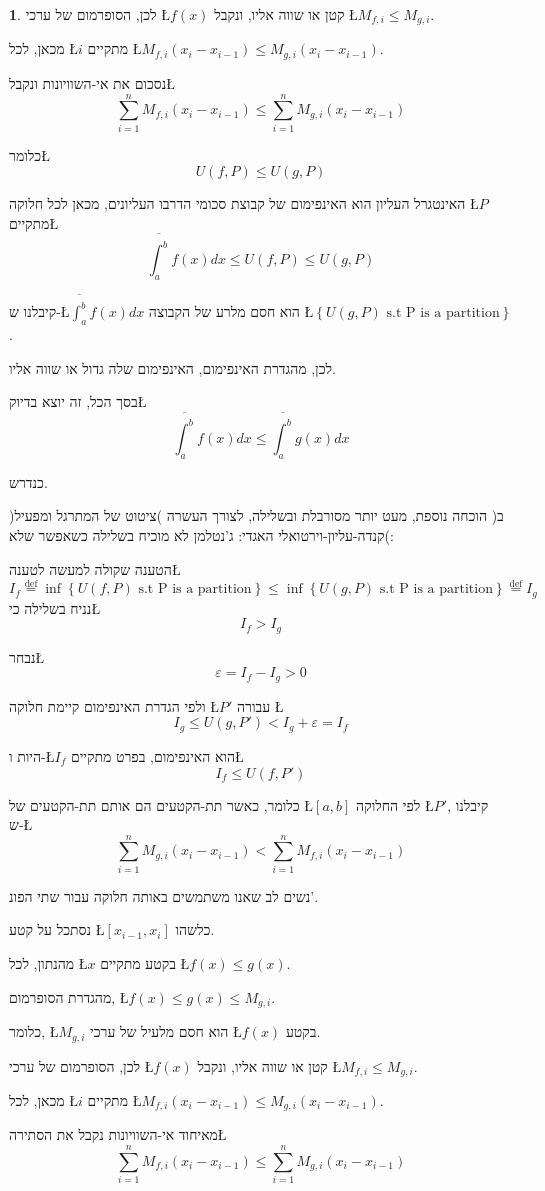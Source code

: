 \documentclass[english,hebrew]{article}
\theoremstyle{plain}
\theoremstyle{definition}
\theoremstyle{definition}
\newtheorem*{sol*}{\protect\solutionname}
\providecommand{\solutionname}{פתרון}
\begin{document}
\begin{sol*}
לכן, הסופרמום של ערכי \L{$f(x)$} קטן או שווה אליו, ונקבל \L{$M_{f,i}\le M_{g,i}$}.

מכאן, לכל \L{$i$} מתקיים \L{$M_{f,i}\left(x_{i}-x_{i-1}\right)\le M_{g,i}\left(x_{i}-x_{i-1}\right)$}.

נסכום את אי-השוויונות ונקבל\L{%
\[
\underset{i=1}{\overset{n}{\sum}}M_{f,i}\left(x_{i}-x_{i-1}\right)\le\underset{i=1}{\overset{n}{\sum}}M_{g,i}\left(x_{i}-x_{i-1}\right)
\]
}%

כלומר\L{%
\[
U\left(f,P\right)\le U\left(g,P\right)
\]
}%

האינטגרל העליון הוא האינפימום של קבוצת סכומי הדרבו העליונים, מכאן
לכל חלוקה \L{$P$} מתקיים\L{%
\[
\overline{\int_{a}^{b}}f(x)dx\le U\left(f,P\right)\le U\left(g,P\right)
\]
}%

קיבלנו ש-\L{$\overline{\int_{a}^{b}}f(x)dx$} הוא חסם מלרע של הקבוצה
\L{$\left\{ U\left(g,P\right)\text{ s.t P is a partition}\right\} $}.

לכן, מהגדרת האינפימום, האינפימום שלה גדול או שווה אליו.

בסך הכל, זה יוצא בדיוק\L{%
\[
\overline{\int_{a}^{b}}f(x)dx\le\overline{\int_{a}^{b}}g(x)dx
\]
}%

כנדרש.

)ב( הוכחה נוספת, מעט יותר מסורבלת ובשלילה, לצורך העשרה )ציטוט של המתרגל
ומפעיל קנדה-עליון-וירטואלי האגדי: ג'נטלמן לא מוכיח בשלילה כשאפשר שלא(:

הטענה שקולה למעשה לטענה\L{%
\[
I_{f}\overset{\text{def}}{=}\inf\left\{ U\left(f,P\right)\text{ s.t P is a partition}\right\} \le\inf\left\{ U\left(g,P\right)\text{ s.t P is a partition}\right\} \overset{\text{def}}{=}I_{g}
\]
}%
נניח בשלילה כי\L{%
\[
I_{f}>I_{g}
\]
}%

נבחר\L{%
\[
\varepsilon=I_{f}-I_{g}>0
\]
}%

ולפי הגדרת האינפימום קיימת חלוקה \L{$P'$} עבורה \L{%
\[
I_{g}\le U\left(g,P'\right)<I_{g}+\varepsilon=I_{f}
\]
}%

היות ו-\L{$I_{f}$} הוא האינפימום, בפרט מתקיים\L{%
\[
I_{f}\le U\left(f,P'\right)
\]
}%

כלומר, כאשר תת-הקטעים הם אותם תת-הקטעים של \L{$\left[a,b\right]$}
לפי החלוקה \L{$P'$}, קיבלנו ש-\L{%
\[
\underset{i=1}{\overset{n}{\sum}}M_{g,i}\left(x_{i}-x_{i-1}\right)<\underset{i=1}{\overset{n}{\sum}}M_{f,i}\left(x_{i}-x_{i-1}\right)
\]
}%

נשים לב שאנו משתמשים באותה חלוקה עבור שתי הפונ'.

נסתכל על קטע \L{$\left[x_{i-1},x_{i}\right]$} כלשהו.

מהנתון, לכל \L{$x$} בקטע מתקיים \L{$f(x)\le g(x)$}.

מהגדרת הסופרמום, \L{$f(x)\le g(x)\le M_{g,i}$}.

כלומר, \L{$M_{g,i}$} הוא חסם מלעיל של ערכי \L{$f(x)$} בקטע.

לכן, הסופרמום של ערכי \L{$f(x)$} קטן או שווה אליו, ונקבל \L{$M_{f,i}\le M_{g,i}$}.

מכאן, לכל \L{$i$} מתקיים \L{$M_{f,i}\left(x_{i}-x_{i-1}\right)\le M_{g,i}\left(x_{i}-x_{i-1}\right)$}.

מאיחוד אי-השוויונות נקבל את הסתירה\L{%
\[
\underset{i=1}{\overset{n}{\sum}}M_{f,i}\left(x_{i}-x_{i-1}\right)\le\underset{i=1}{\overset{n}{\sum}}M_{g,i}\left(x_{i}-x_{i-1}\right)
\]
}%
\end{sol*}
\end{document}

